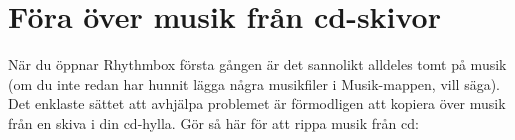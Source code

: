 \documentclass[a4paper,final]{memoir} %
\begin{document}

\section{Föra över musik från cd-skivor}


När du öppnar Rhythmbox första gången är det sannolikt alldeles tomt på musik (om du inte redan har hunnit lägga några musikfiler i Musik-mappen, vill säga). Det enklaste sättet att avhjälpa problemet är förmodligen att kopiera över musik från en skiva i din cd-hylla. 
Gör så här för att rippa musik från cd:
\end{document}
